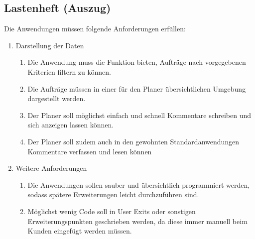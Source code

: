 \subsection{Lastenheft (Auszug)}
\label{app:Lastenheft}

Die Anwendungen müssen folgende Anforderungen erfüllen: 
\begin{enumerate}[itemsep=0em,partopsep=0em,parsep=0em,topsep=0em]
\item Darstellung der Daten
	\begin{enumerate}
	\item Die Anwendung muss die Funktion bieten, Aufträge nach vorgegebenen Kriterien filtern zu können.
	\item Die Aufträge müssen in einer für den Planer übersichtlichen Umgebung dargestellt werden.
	\item Der Planer soll möglichst einfach und schnell Kommentare schreiben und sich anzeigen lassen können. 
	\item Der Planer soll zudem auch in den gewohnten Standardanwendungen Kommentare verfassen und lesen können 
	\end{enumerate}
\item Weitere Anforderungen
	\begin{enumerate}
	\item Die Anwendungen sollen sauber und übersichtlich programmiert werden, sodass spätere Erweiterungen leicht durchzuführen sind.
	\item Möglichst wenig Code soll in User Exits oder sonstigen Erweiterungspunkten geschrieben werden, da diese immer manuell beim Kunden eingefügt werden müssen.
	\end{enumerate}
\end{enumerate}

